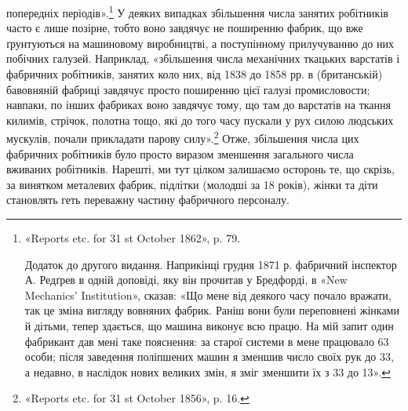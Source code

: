 \parcont{}  %
попередніх періодів».\footnote{
«Reports etc. for 31 st October 1862», p. 79.

Додаток до другого видання. Наприкінці грудня 1871 р. фабричний
інспектор А. Редґрев в одній доповіді, яку він прочитав у Бредфорді, в
«New Mechanics’ Institution», сказав: «Що мене від деякого часу почало
вражати, так це зміна вигляду вовняних фабрик. Раніш вони були переповнені
жінками й дітьми, тепер здається, що машина виконує всю працю.
На мій запит один фабрикант дав мені таке пояснення: за старої системи в
мене працювало 63 особи; після заведення поліпшених машин я зменшив
число своїх рук до 33, а недавно, в наслідок нових великих змін, я зміг
зменшити їх з 33 до 13».
} У деяких випадках збільшення числа
занятих робітників часто є лише позірне, тобто воно завдячує не
поширенню фабрик, що вже ґрунтуються на машиновому виробництві,
а поступінному прилучуванню до них побічних галузей.
Наприклад, «збільшення числа механічних ткацьких варстатів
і фабричних робітників, занятих коло них, від 1838 до 1858 рр.
в (британській) бавовняній фабриці завдячує просто поширенню
цієї галузі промисловости; навпаки, по інших фабриках воно
завдячує тому, що там до варстатів на ткання килимів, стрічок,
полотна тощо, які до того часу пускали у рух силою людських
мускулів, почали прикладати парову силу».\footnote{
«Reports etc. for 31 st October 1856», p. 16.
} Отже, збільшення
числа цих фабричних робітників було просто виразом зменшення
загального числа вживаних робітників. Нарешті, ми тут цілком
залишаємо осторонь те, що скрізь, за винятком металевих фабрик,
підлітки (молодші за 18 років), жінки та діти становлять геть
переважну частину фабричного персоналу.

